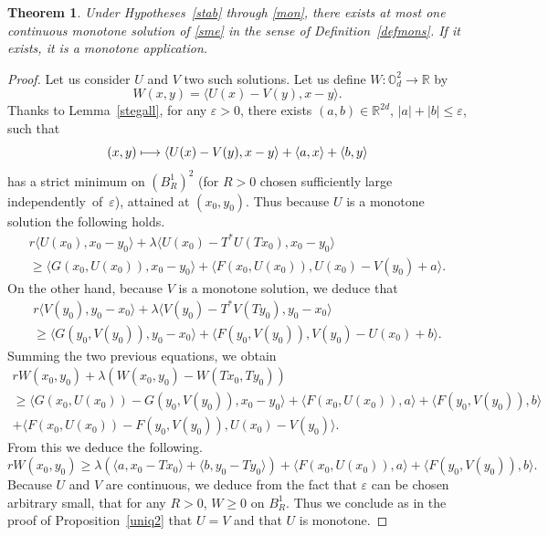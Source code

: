 \documentclass[JEP,XML,SOM,Unicode,NoEqCountersInSection,published]{cedram}
\newcommand\mto{\mathchoice{\longmapsto}{\mapsto}{\mapsto}{\mapsto}}
\let\epsilon\varepsilon
\newtheorem{Theorem}{Theorem}[section]
\theoremstyle{definition}
\begin{document}
\begin{Theorem}\label{uniqstat}
Under Hypotheses~\ref{stab} through \ref{mon}, there exists at most one continuous monotone solution of \eqref{sme} in the sense of Definition~\ref{defmons}. If it exists, it is a monotone application.
\end{Theorem}
\begin{proof}
Let us consider $U$ and $V$ two such solutions. Let us define $W: \mathbb{O}_d^2 \to \mathbb{R}$ by
\begin{equation*}
W(x,y) = \langle U(x)-V(y), x-y \rangle.
\end{equation*}
Thanks to Lemma~\ref{stegall}, for any $\epsilon > 0$, there exists $(a,b)\in \mathbb{R}^{2d}$, $|a|+|b| \leq \epsilon$, such that
\[
(x,y) \mto \langle U(x)-V(y) , x-y \rangle+\langle a,x\rangle+\langle b, y\rangle
\]
has a strict minimum on $(B_R^1)^2$ (for $R\!>\!0$ chosen sufficiently large independently~of~$\epsilon$), attained at $(x_0,y_0)$. Thus because $U$ is a monotone solution the following holds.
\begin{multline*}
r\langle U(x_0), x_0-y_0\rangle+ \lambda\langle U(x_0)-T^*U(Tx_0), x_0-y_0\rangle \\
\geq
\langle G(x_0, U(x_0)), x_0-y_0\rangle+\langle F(x_0,U(x_0)), U(x_0)-V(y_0)+a\rangle.
\end{multline*}
On the other hand, because $V$ is a monotone solution, we deduce that
\begin{multline*}
r\langle V(y_0), y_0-x_0\rangle+ \lambda \langle V(y_0) -T^*V(Ty_0), y_0-x_0\rangle \\
\geq
\langle G(y_0, V(y_0)), y_0-x_0\rangle+\langle F(y_0,V(y_0)), V(y_0)-U(x_0)+b\rangle.
\end{multline*}
Summing the two previous equations, we obtain
\begin{multline*}
rW(x_0,y_0) + \lambda (W(x_0,y_0)-W(Tx_0,Ty_0))\\
\geq
 \langle G(x_0,U(x_0))-G(y_0,V(y_0)),x_0-y_0 \rangle+ \langle F(x_0,U(x_0)),a\rangle+\langle F(y_0,V(y_0)),b\rangle\\
+ \langle F(x_0,U(x_0))-F(y_0,V(y_0)),U(x_0)-V(y_0) \rangle.
\end{multline*}
From this we deduce the following.
\[
rW(x_0,y_0) \geq \lambda (\langle a, x_0-Tx_0\rangle+\langle b, y_0-Ty_0\rangle)+\langle F(x_0,U(x_0)),a\rangle+\langle F(y_0,V(y_0)),b\rangle.
\]
Because $U$ and $V$ are continuous, we deduce from the fact that $\epsilon$ can be chosen arbitrary small, that for any $R> 0$, $W \geq 0$ on $B^1_R$. Thus we conclude as in the proof of Proposition~\ref{uniq2} that $U = V$ and that $U$ is monotone.
\end{proof}
\end{document}
